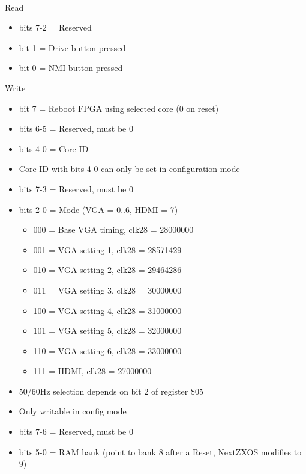 \\
Read
\begin{itemize}
\item bits 7-2 = Reserved
\item bit 1 = Drive button pressed
\item bit 0 = NMI button pressed
\end{itemize}
Write
\begin{itemize}
\item bit 7 = Reboot FPGA using selected core (0 on reset)
\item bits 6-5 = Reserved, must be 0
\item bits 4-0 = Core ID
\item[] Core ID with bits 4-0 can only be set in configuration mode
\end{itemize}

\begin{itemize}
\item bits 7-3 = Reserved, must be 0
\item bits 2-0 = Mode (VGA = 0..6, HDMI = 7)
  \begin{itemize}
  \item 000 = Base VGA timing, clk28 = 28000000
  \item 001 = VGA setting 1, clk28 = 28571429
  \item 010 = VGA setting 2, clk28 = 29464286
  \item 011 = VGA setting 3, clk28 = 30000000
  \item 100 = VGA setting 4, clk28 = 31000000
  \item 101 = VGA setting 5, clk28 = 32000000
  \item 110 = VGA setting 6, clk28 = 33000000
  \item 111 = HDMI, clk28 = 27000000
  \end{itemize}
\item[] 50/60Hz selection depends on bit 2 of register \$05
\item[] Only writable in config mode
\end{itemize}

\begin{itemize}
\item bits 7-6 = Reserved, must be 0
\item bits 5-0 = RAM bank (point to bank 8 after a Reset, NextZXOS
  modifies to 9)
\end{itemize}

